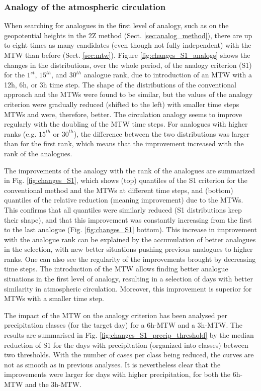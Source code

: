\documentclass[hess, manuscript]{copernicus}
\begin{document}
	\subsubsection{Analogy of the atmospheric circulation}
	\label{sec:changes_analogy_circul}
	
	When searching for analogues in the first level of analogy, such as on the geopotential heights in the 2Z method (Sect. \ref{sec:analog_method}), there are up to eight times as many candidates (even though not fully independent) with the MTW than before (Sect. \ref{sec:mtw}). Figure \ref{fig:changes_S1_analogs} shows the changes in the distributions, over the whole period, of the analogy criterion (S1) for the $1^{st}$, $15^{th}$, and $30^{th}$ analogue rank, due to introduction of an MTW with a 12h, 6h, or 3h time step. The shape of the distributions of the conventional approach and the MTWs were found to be similar, but the values of the analogy criterion were gradually reduced (shifted to the left) with smaller time steps MTWs and were, therefore, better. The circulation analogy seems to improve regularly with the doubling of the MTW time steps. For analogues with higher ranks (e.g. $15^{th}$ or $30^{th}$), the difference between the two distributions was larger than for the first rank, which means that the improvement increased with the rank of the analogues. 
	
	The improvements of the analogy with the rank of the analogues are summarized in Fig. \ref{fig:changes_S1}, which shows (top) quantiles of the S1 criterion for the conventional method and the MTWs at different time steps, and (bottom) quantiles of the relative reduction (meaning improvement) due to the MTWs. This confirms that all quantiles were similarly reduced (S1 distributions keep their shape), and that this improvement was constantly increasing from the first to the last analogue (Fig. \ref{fig:changes_S1} bottom). This increase in improvement with the analogue rank can be explained by the accumulation of better analogues in the selection, with new better situations pushing previous analogues to higher ranks. One can also see the regularity of the improvements brought by decreasing time steps. The introduction of the MTW allows finding better analogue situations in the first level of analogy, resulting in a selection of days with better similarity in atmospheric circulation. Moreover, this improvement is superior for MTWs with a smaller time step.
	
	The impact of the MTW on the analogy criterion has been analysed per precipitation classes (for the target day) for a 6h-MTW and a 3h-MTW. The results are summarised in Fig. \ref{fig:changes_S1_precip_threshold} by the median reduction of S1 for the days with precipitation (organized into classes) between two thresholds. With the number of cases per class being reduced, the curves are not as smooth as in previous analyses. It is nevertheless clear that the improvements were larger for days with higher precipitation, for both the 6h-MTW and the 3h-MTW.
	
\end{document}
